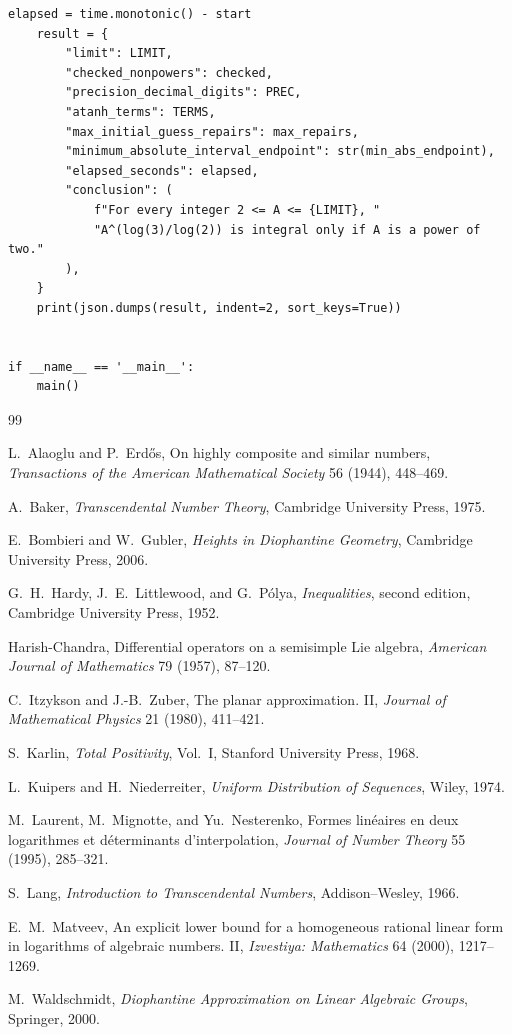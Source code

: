 \documentclass[11pt]{article}
\theoremstyle{definition}
\begin{document}
\begin{lstlisting}[style=proofpython]
    elapsed = time.monotonic() - start
    result = {
        "limit": LIMIT,
        "checked_nonpowers": checked,
        "precision_decimal_digits": PREC,
        "atanh_terms": TERMS,
        "max_initial_guess_repairs": max_repairs,
        "minimum_absolute_interval_endpoint": str(min_abs_endpoint),
        "elapsed_seconds": elapsed,
        "conclusion": (
            f"For every integer 2 <= A <= {LIMIT}, "
            "A^(log(3)/log(2)) is integral only if A is a power of two."
        ),
    }
    print(json.dumps(result, indent=2, sort_keys=True))


if __name__ == '__main__':
    main()
\end{lstlisting}

\begin{thebibliography}{99}

L.~Alaoglu and P.~Erd\H{o}s,
\newblock On highly composite and similar numbers,
\newblock \emph{Transactions of the American Mathematical Society} 56 (1944),
448--469.

A.~Baker,
\newblock \emph{Transcendental Number Theory},
\newblock Cambridge University Press, 1975.

E.~Bombieri and W.~Gubler,
\newblock \emph{Heights in Diophantine Geometry},
\newblock Cambridge University Press, 2006.

G.~H.~Hardy, J.~E.~Littlewood, and G.~P\'olya,
\newblock \emph{Inequalities}, second edition,
\newblock Cambridge University Press, 1952.

Harish-Chandra,
\newblock Differential operators on a semisimple Lie algebra,
\newblock \emph{American Journal of Mathematics} 79 (1957), 87--120.

C.~Itzykson and J.-B.~Zuber,
\newblock The planar approximation. II,
\newblock \emph{Journal of Mathematical Physics} 21 (1980), 411--421.

S.~Karlin,
\newblock \emph{Total Positivity}, Vol.~I,
\newblock Stanford University Press, 1968.

L.~Kuipers and H.~Niederreiter,
\newblock \emph{Uniform Distribution of Sequences},
\newblock Wiley, 1974.

M.~Laurent, M.~Mignotte, and Yu.~Nesterenko,
\newblock Formes lin\'eaires en deux logarithmes et d\'eterminants
 d'interpolation,
\newblock \emph{Journal of Number Theory} 55 (1995), 285--321.

S.~Lang,
\newblock \emph{Introduction to Transcendental Numbers},
\newblock Addison--Wesley, 1966.

E.~M.~Matveev,
\newblock An explicit lower bound for a homogeneous rational linear form in
 logarithms of algebraic numbers. II,
\newblock \emph{Izvestiya: Mathematics} 64 (2000), 1217--1269.

M.~Waldschmidt,
\newblock \emph{Diophantine Approximation on Linear Algebraic Groups},
\newblock Springer, 2000.

\end{thebibliography}
\end{document}
